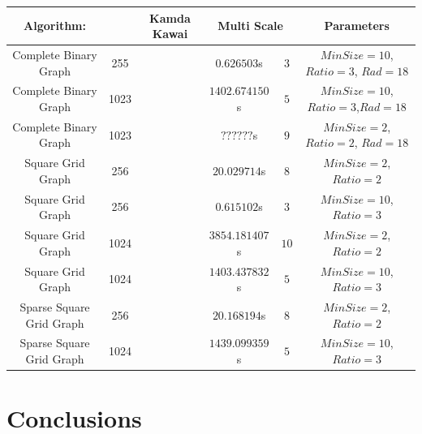 \documentclass[12pt,a4paper]{article}
\begin{document}
\begin{table}[htb]

\begin{tabular}{|c|c||c|c|c|c|c|}
\hline
Algorithm: & & \multicolumn{2}{|c|}{Kamda Kawai} &  \multicolumn{2}{|c|}{Multi Scale} & Parameters \\
\hline
\hline 
Complete Binary Graph & 255  & & & $0.626503$s    & $3$ & $MinSize=10$, $Ratio=3$, $Rad = 18$\\ 
\hline 
Complete Binary Graph & 1023 & & & $1402.674150$s & $5$ & $MinSize=10$, $Ratio=3$,$Rad = 18$\\ 
\hline 
Complete Binary Graph & 1023 & & & $??????$s & $9$ & $MinSize=2$, $Ratio=2$, $Rad = 18$\\ 
\hline \hline
Square Grid Graph     & 256 & & & $20.029714$s & $8$ & $MinSize=2$, $Ratio=2$\\ 
\hline
Square Grid Graph     & 256 & & & $0.615102$s & $3$ & $MinSize=10$, $Ratio=3$\\ 
\hline
Square Grid Graph     & 1024 & & & $3854.181407$s & $10$ & $MinSize=2$, $Ratio=2$\\ 
\hline
Square Grid Graph     & 1024 & & & $1403.437832$s & $5$ & $MinSize=10$, $Ratio=3$\\ 
\hline\hline
Sparse Square Grid Graph & 256 & & & $20.168194$s & $8$ & $MinSize=2$, $Ratio=2$\\ 
\hline
Sparse Square Grid Graph & 1024 & & & $1439.099359$s & $5$ & $MinSize=10$, $Ratio=3$\\ 

\hline 
\end{tabular} 
\end{table}
\FloatBarrier 

\section{Conclusions}



\end{document}
